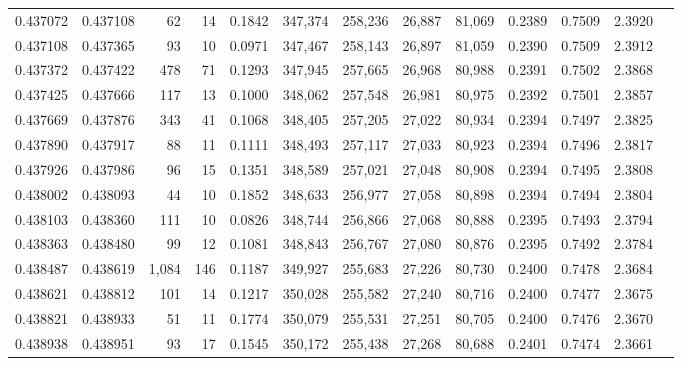 \begin{tabular}{rrrrrrrrrrrrr}
0.437072 & 0.437108 &    62 &  14 &                                     0.1842 & 347,374 & 258,236 &  26,887 &  81,069 & 0.2389 & 0.7509 & 2.3920 \\
0.437108 & 0.437365 &    93 &  10 &                                     0.0971 & 347,467 & 258,143 &  26,897 &  81,059 & 0.2390 & 0.7509 & 2.3912 \\
0.437372 & 0.437422 &   478 &  71 &                                     0.1293 & 347,945 & 257,665 &  26,968 &  80,988 & 0.2391 & 0.7502 & 2.3868 \\
0.437425 & 0.437666 &   117 &  13 &                                     0.1000 & 348,062 & 257,548 &  26,981 &  80,975 & 0.2392 & 0.7501 & 2.3857 \\
0.437669 & 0.437876 &   343 &  41 &                                     0.1068 & 348,405 & 257,205 &  27,022 &  80,934 & 0.2394 & 0.7497 & 2.3825 \\
0.437890 & 0.437917 &    88 &  11 &                                     0.1111 & 348,493 & 257,117 &  27,033 &  80,923 & 0.2394 & 0.7496 & 2.3817 \\
0.437926 & 0.437986 &    96 &  15 &                                     0.1351 & 348,589 & 257,021 &  27,048 &  80,908 & 0.2394 & 0.7495 & 2.3808 \\
0.438002 & 0.438093 &    44 &  10 &                                     0.1852 & 348,633 & 256,977 &  27,058 &  80,898 & 0.2394 & 0.7494 & 2.3804 \\
0.438103 & 0.438360 &   111 &  10 &                                     0.0826 & 348,744 & 256,866 &  27,068 &  80,888 & 0.2395 & 0.7493 & 2.3794 \\
0.438363 & 0.438480 &    99 &  12 &                                     0.1081 & 348,843 & 256,767 &  27,080 &  80,876 & 0.2395 & 0.7492 & 2.3784 \\
0.438487 & 0.438619 & 1,084 & 146 &                                     0.1187 & 349,927 & 255,683 &  27,226 &  80,730 & 0.2400 & 0.7478 & 2.3684 \\
0.438621 & 0.438812 &   101 &  14 &                                     0.1217 & 350,028 & 255,582 &  27,240 &  80,716 & 0.2400 & 0.7477 & 2.3675 \\
0.438821 & 0.438933 &    51 &  11 &                                     0.1774 & 350,079 & 255,531 &  27,251 &  80,705 & 0.2400 & 0.7476 & 2.3670 \\
0.438938 & 0.438951 &    93 &  17 &                                     0.1545 & 350,172 & 255,438 &  27,268 &  80,688 & 0.2401 & 0.7474 & 2.3661 \\

\end{tabular}
